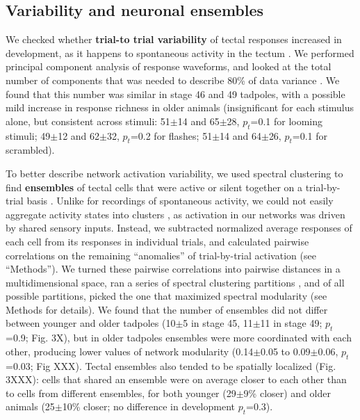 \documentclass{article}
\begin{document}
\subsection*{Variability and neuronal ensembles}

We checked whether \textbf{trial-to trial variability} of tectal responses increased in development, as it happens to spontaneous activity in the tectum \citep{xu2011}. We performed principal component analysis of response waveforms, and looked at the total number of components that was needed to describe 80\% of data variance \citep{avitan2017spontaneous}. We found that this number was similar in stage 46 and 49 tadpoles, with a possible mild increase in response richness in older animals (insignificant for each stimulus alone, but consistent across stimuli: 51$\pm$14 and 65$\pm$28, $p_t$=0.1 for looming stimuli; 49$\pm$12 and 62$\pm$32, $p_t$=0.2 for flashes; 51$\pm$14 and 64$\pm$26, $p_t$=0.1 for scrambled).

To better describe network activation variability, we used spectral clustering to find \textbf{ensembles} of tectal cells that were active or silent together on a trial-by-trial basis \citep{thompson2016ensembles}. Unlike for recordings of spontaneous activity, we could not easily aggregate activity states into clusters \citep{avitan2017spontaneous}, as activation in our networks was driven by shared sensory inputs. Instead, we subtracted normalized average responses of each cell from its responses in individual trials, and calculated pairwise correlations on the remaining “anomalies” of trial-by-trial activation (see “Methods”). We turned these pairwise correlations into pairwise distances in a multidimensional space, ran a series of spectral clustering partitions \citep{ng2002spectral}, and of all possible partitions, picked the one that maximized spectral modularity \citep{newman2006modularity,gomez2009community} (see Methods for details). We found that the number of ensembles did not differ between younger and older tadpoles (10$\pm$5 in stage 45, 11$\pm$11 in stage 49; $p_t$=0.9; Fig. 3X), but in older tadpoles ensembles were more coordinated with each other,  producing lower values of network modularity (0.14$\pm$0.05 to 0.09$\pm$0.06, $p_t$=0.03; Fig XXX). Tectal ensembles also tended to be spatially localized (Fig. 3XXX): cells that shared an ensemble were on average closer to each other than to cells from different ensembles, for both younger (29$\pm$9\% closer) and older animals (25$\pm$10\% closer; no difference in development $p_t$=0.3).
\end{document}
